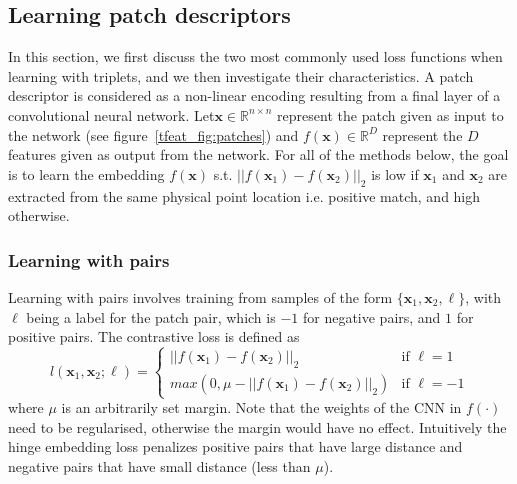 \subsection{Learning patch descriptors}

In this section, we first discuss the two most commonly used loss functions when learning with triplets, and we then investigate their characteristics.  A patch descriptor is considered as  a non-linear encoding resulting from a final layer of a convolutional neural network. Let$\boldsymbol x \in \mathbb{R}^{n \times n}$ represent the patch given
as input to the network (see figure~\ref{tfeat_fig:patches}) and $f(\boldsymbol x) \in \mathbb{R}^{D}$
represent the $D$ features given as output from the network.
For all of the methods below, the goal is to learn the embedding
$f(\boldsymbol x)$ s.t. $||f(\boldsymbol x_1) - f(\boldsymbol x_2)
||_2$ is low if $\boldsymbol x_1$ and $\boldsymbol x_2$ are extracted from the same physical point location i.e. positive match, and high otherwise.

\subsubsection{Learning with pairs}
Learning with pairs involves training from samples of the form
$\{\boldsymbol x_1,\boldsymbol x_2,\ell\}$, with  $\ell$ being 
 a label for the patch pair, which is $-1$
for negative pairs, and $1$ for positive pairs. The contrastive loss is defined as 
\begin{equation}
  \label{eq:contrastive-loss}
  l(\boldsymbol x_1,\boldsymbol x_2;\ell) =
\left\{
	\begin{array}{ll}
		||f(\boldsymbol x_1)-f(\boldsymbol x_2)||_2  & \mbox{if } \ell=1 \\
		max(0,\mu-||f(\boldsymbol x_1)-f(\boldsymbol x_2)||_2)  & \mbox{if } \ell=-1
	\end{array}
\right.
\end{equation}
where $\mu$ is an arbitrarily set margin. Note that the
weights of the CNN in $f(\cdot)$ need to be regularised, otherwise the margin would
have no effect. Intuitively the hinge embedding loss penalizes positive pairs
that have large distance and negative
pairs that have small distance (less than $\mu$).

